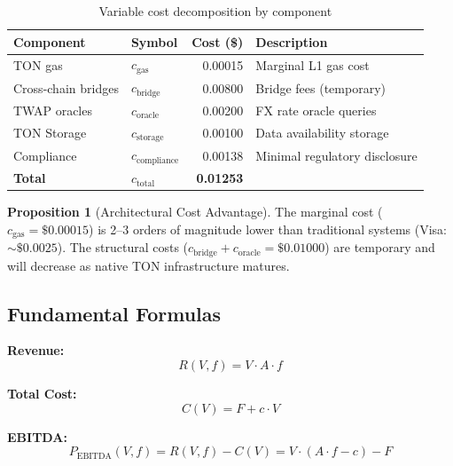 \documentclass[12pt,a4paper]{article}
\theoremstyle{definition}
\newtheorem{proposition}[theorem]{Proposition}
\theoremstyle{remark}
\newcommand{\USD}[1]{\$#1}
\DeclareMathOperator{\EBITDA}{EBITDA}
\begin{document}
\begin{table}[H]
\centering
\caption{Variable cost decomposition by component}
\label{tab:cost-decomposition}
\begin{tabular}{llrl}
\toprule
\textbf{Component} & \textbf{Symbol} & \textbf{Cost (\USD{})} & \textbf{Description} \\
\midrule
TON gas & $c_{\text{gas}}$ & 0.00015 & Marginal L1 gas cost \\
Cross-chain bridges & $c_{\text{bridge}}$ & 0.00800 & Bridge fees (temporary) \\
TWAP oracles & $c_{\text{oracle}}$ & 0.00200 & FX rate oracle queries \\
TON Storage & $c_{\text{storage}}$ & 0.00100 & Data availability storage \\
Compliance & $c_{\text{compliance}}$ & 0.00138 & Minimal regulatory disclosure \\
\midrule
\textbf{Total} & $c_{\text{total}}$ & \textbf{0.01253} & \\
\bottomrule
\end{tabular}
\end{table}

\begin{proposition}[Architectural Cost Advantage]
\label{prop:cost-advantage}
The marginal cost ($c_{\text{gas}} = \USD{0.00015}$) is 2--3 orders of magnitude lower than traditional systems (Visa: ${\sim}\USD{0.0025}$). The structural costs ($c_{\text{bridge}} + c_{\text{oracle}} = \USD{0.01000}$) are temporary and will decrease as native TON infrastructure matures.
\end{proposition}

\subsection{Fundamental Formulas}

\textbf{Revenue:}
\begin{equation}
\label{eq:revenue}
R(V, f) = V \cdot A \cdot f
\end{equation}

\textbf{Total Cost:}
\begin{equation}
\label{eq:total-cost}
C(V) = F + c \cdot V
\end{equation}

\textbf{EBITDA:}
\begin{equation}
\label{eq:ebitda}
P_{\EBITDA}(V, f) = R(V, f) - C(V) = V \cdot (A \cdot f - c) - F
\end{equation}
\end{document}
